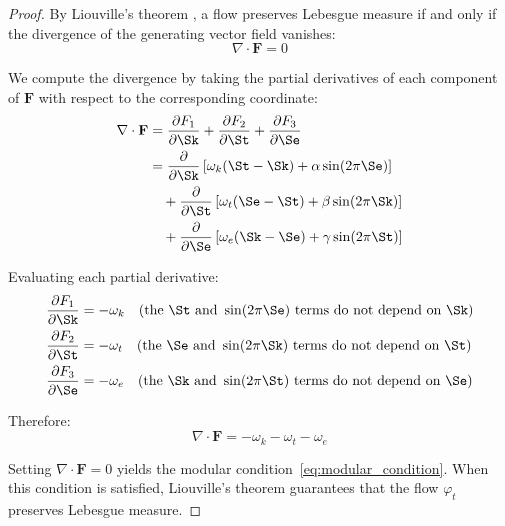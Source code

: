 \begin{proof}
By Liouville's theorem \citep{arnold1989mathematical}, a flow preserves Lebesgue measure if and only if the divergence of the generating vector field vanishes:
\begin{equation}
\nabla \cdot \mathbf{F} = 0
\label{eq:divergence_condition}
\end{equation}

We compute the divergence by taking the partial derivatives of each component of $\mathbf{F}$ with respect to the corresponding coordinate:
\begin{align}
\nabla \cdot \mathbf{F} &= \frac{\partial F_1}{\partial \Sk} + \frac{\partial F_2}{\partial \St} + \frac{\partial F_3}{\partial \Se} \\
&= \frac{\partial}{\partial \Sk}\left[\omega_k (\St - \Sk) + \alpha \sin(2\pi \Se)\right] \nonumber \\
&\quad + \frac{\partial}{\partial \St}\left[\omega_t (\Se - \St) + \beta \sin(2\pi \Sk)\right] \nonumber \\
&\quad + \frac{\partial}{\partial \Se}\left[\omega_e (\Sk - \Se) + \gamma \sin(2\pi \St)\right]
\end{align}

Evaluating each partial derivative:
\begin{align}
\frac{\partial F_1}{\partial \Sk} &= -\omega_k \quad \text{(the } \St \text{ and } \sin(2\pi \Se) \text{ terms do not depend on } \Sk\text{)} \\
\frac{\partial F_2}{\partial \St} &= -\omega_t \quad \text{(the } \Se \text{ and } \sin(2\pi \Sk) \text{ terms do not depend on } \St\text{)} \\
\frac{\partial F_3}{\partial \Se} &= -\omega_e \quad \text{(the } \Sk \text{ and } \sin(2\pi \St) \text{ terms do not depend on } \Se\text{)}
\end{align}

Therefore:
\begin{equation}
\nabla \cdot \mathbf{F} = -\omega_k - \omega_t - \omega_e
\end{equation}

Setting $\nabla \cdot \mathbf{F} = 0$ yields the modular condition~\eqref{eq:modular_condition}. When this condition is satisfied, Liouville's theorem guarantees that the flow $\varphi_t$ preserves Lebesgue measure.
\end{proof}

